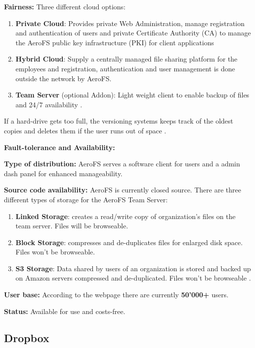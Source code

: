 \textbf{Fairness:} Three different cloud options:
\begin{enumerate}
\item \textbf{Private Cloud}: Provides private Web Administration, manage registration and authentication of users and private Certificate Authority (CA) to manage the AeroFS public key infrastructure (PKI) for client applications
\item \textbf{Hybrid Cloud}: Supply a centrally managed file sharing platform for the employees and registration, authentication and user management is done outside the network by AeroFS.
\item \textbf{Team Server} (optional Addon): Light weight client to enable backup of files and 24/7 availability \cite{aerofs:cloud_types}.
\end{enumerate}
If a hard-drive gets too full, the versioning systems keeps track of the oldest copies and deletes them if the user runs out of space \cite{aerofs:USTO.RE}.

\textbf{Fault-tolerance and Availability:} 

\textbf{Type of distribution:} AeroFS serves a software client for users and a admin dash panel for enhanced manageability.

\textbf{Source code availability:} AeroFS is currently closed source.
There are three different types of storage for the AeroFS Team Server:
\begin{enumerate}
\item \textbf{Linked Storage}: creates a read/write copy of organization's files on the team server. Files will be browseable.
\item \textbf{Block Storage}: compresses and de-duplicates files for enlarged disk space. Files won't be browseable.
\item \textbf{S3 Storage}: Data shared by users of an organization is stored and backed up on Amazon servers compressed and de-duplicated. Files won't be browseable \cite{aerofs:storage_types}.
\end{enumerate}

\textbf{User base:} According to the webpage \cite{aerofs} there are currently \textbf{50'000+} users.

\textbf{Status:} Available for use and costs-free.

\subsection{Dropbox}

